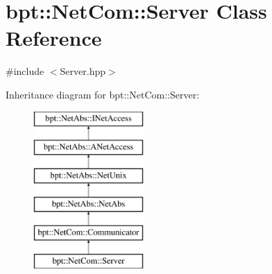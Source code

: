 \hypertarget{classbpt_1_1_net_com_1_1_server}{\section{bpt\-:\-:Net\-Com\-:\-:Server Class Reference}
\label{classbpt_1_1_net_com_1_1_server}
}


{\ttfamily \#include $<$Server.\-hpp$>$}

Inheritance diagram for bpt\-:\-:Net\-Com\-:\-:Server\-:\begin{figure}[H]
\begin{center}
\leavevmode
\includegraphics[height=6.000000cm]{classbpt_1_1_net_com_1_1_server}
\end{center}
\end{figure}
